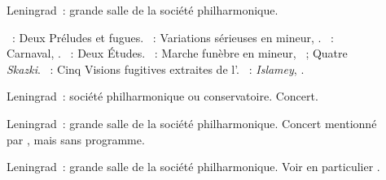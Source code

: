 \begin{description}
 \item[]
 Leningrad~: grande salle de la société philharmonique.

 \textsc{\JBach{}}~: Deux Préludes et fugues.
 \textsc{\Mendelssohn{}}~: Variations sérieuses en \kD mineur, .
 \textsc{\Schumann{}}~: Carnaval, .
 \textsc{\Scriabine{}}~: Deux Études.
 \textsc{\Medtner{}}~: Marche funèbre en \kB mineur,  ~;
 Quatre \emph{Skazki}.
 \textsc{\Prokofiev{}}~: Cinq Visions fugitives extraites de l'.
 \textsc{\Balakirev{}}~: \emph{Islamey}, .
 \item[]
 Leningrad~: société philharmonique ou conservatoire.
 Concert.
 \item[]
 Leningrad~: grande salle de la société philharmonique.
 Concert mentionné par \citet[p.~155]{Nekrasova08}, mais sans programme.
 \item[]
 Leningrad~: grande salle de la société philharmonique.
 Voir en particulier \citet[p.~427]{Milshteyn82a}.


\end{description}
